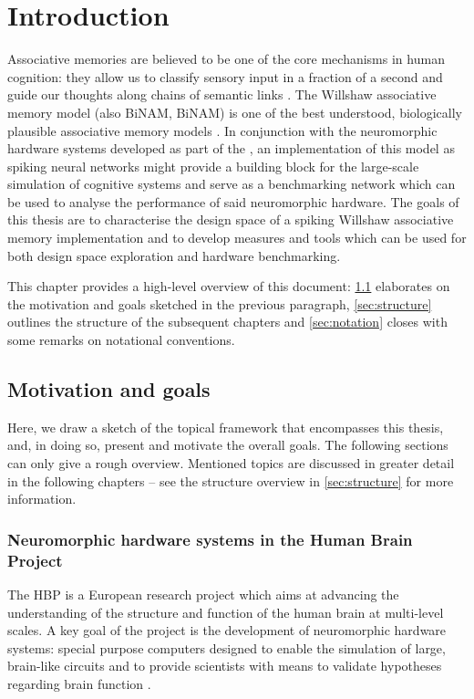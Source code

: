\chapter{Introduction}
\label{chp:introduction}

Associative memories are believed to be one of the core mechanisms in human cognition: they allow us to classify sensory input in a fraction of a second and guide our thoughts along chains of semantic links \cite{palm2013neural}. The Willshaw associative memory model (also \acrlong{BiNAM}, \acrshort{BiNAM}) is one of the best understood, biologically plausible associative memory models \cite{steinbuch1961lernmatrix,BiNAM1969,palm1980associative}. In conjunction with the neuromorphic hardware systems developed as part of the \HBP \cite{hbp_projects}, an implementation of this model as spiking neural networks might provide a building block for the large-scale simulation of cognitive systems and serve as a benchmarking network which can be used to analyse the performance of said neuromorphic hardware. The goals of this thesis are to characterise the design space of a spiking Willshaw associative memory implementation and to develop measures and tools which can be used for both design space exploration and hardware benchmarking.

This chapter provides a high-level overview of this document: \cref{sec:motivation_goals} elaborates on the motivation and goals sketched in the previous paragraph, \cref{sec:structure} outlines the structure of the subsequent chapters and \cref{sec:notation} closes with some remarks on notational conventions.

\section{Motivation and goals}
\label{sec:motivation_goals}

Here, we draw a sketch of the topical framework that encompasses this thesis, and, in doing so, present and motivate the overall goals. The following sections can only give a rough overview. Mentioned topics are discussed in greater detail in the following chapters -- see the structure overview in \cref{sec:structure} for more information.

\subsection{Neuromorphic hardware systems in the Human Brain Project}

The \acrfull{HBP} is a European research project which aims at advancing the understanding of the structure and function of the human brain at multi-level scales. A key goal of the project is the development of neuromorphic hardware systems: special purpose computers designed to enable the simulation of large, brain-like circuits and to provide scientists with means to validate hypotheses regarding brain function \cite{hbp_objectives}.

